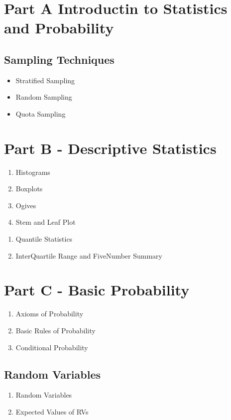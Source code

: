\documentclass[]{article}
\title{}
\author{}
\begin{document}
\section{Part A Introductin to Statistics and Probability}


\subsection{Sampling Techniques}
\begin{itemize}
\item Stratified Sampling
\item Random Sampling
\item Quota Sampling
\end{itemize}
\section{Part B - Descriptive Statistics}

\begin{enumerate}
\item Histograms
\item Boxplots
\item Ogives
\item Stem and Leaf Plot
\end{enumerate}

\begin{enumerate}
\item Quantile Statistics
\item InterQuartile Range and FiveNumber Summary
\end{enumerate}

\section{Part C - Basic Probability}

\begin{enumerate}
\item Axioms of Probability
\item Basic Rules of Probability
\item Conditional Probability
\end{enumerate}

\subsection{Random Variables}
\begin{enumerate}
\item Random Variables
\item Expected Values of RVs
\end{enumerate}
\end{document}
